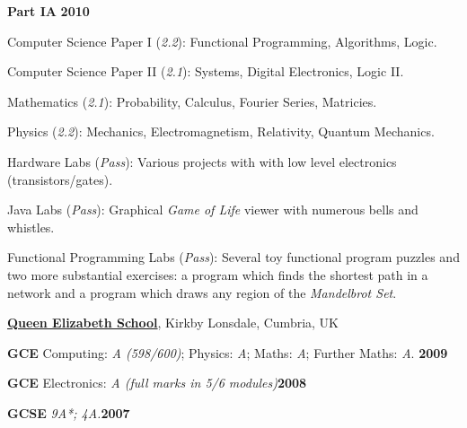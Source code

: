 \documentclass[10pt]{article}
\newenvironment{outerlist}[1][\enskip\textbullet]%
        {\begin{itemize}[#1]}{\end{itemize}%
         \vspace{-.6\baselineskip}}
\newenvironment{innerlist}[1][\enskip\textbullet]%
        {\begin{compactitem}[#1]}{\end{compactitem}}
\newcommand{\blankline}{\quad\pagebreak[2]}
\begin{document}
\begin{outerlist}
\begin{innerlist}
\blankline
\item[] \textbf{Part IA} \hfill \textbf{2010}
        \begin{innerlist}
        \item Computer Science Paper I (\emph{2.2}): Functional Programming, Algorithms, Logic.
        \item Computer Science Paper II (\emph{2.1}): Systems, Digital Electronics, Logic II.
        \item Mathematics (\emph{2.1}): Probability, Calculus, Fourier Series, Matricies.
	\item Physics (\emph{2.2}): Mechanics, Electromagnetism, Relativity, Quantum Mechanics.
	\item Hardware Labs (\emph{Pass}): Various projects with with low level electronics (transistors/gates).
	\item Java Labs (\emph{Pass}): Graphical \emph{Game of Life} viewer with numerous bells and whistles.
	\item Functional Programming Labs (\emph{Pass}): Several toy functional program puzzles and two more substantial exercises: a program which finds the shortest path in a network and a program which draws any region of the \emph{Mandelbrot Set}.
        \end{innerlist}
\end{innerlist}
\end{outerlist}

\blankline

\textbf{\href{http://www.queenelizabeth.cumbria.sch.uk/}{Queen Elizabeth School}}, Kirkby Lonsdale, Cumbria, UK
\begin{innerlist}
\item[] \textbf{GCE} Computing: \emph{A (598/600)}; Physics: \emph{A}; Maths: \emph{A}; Further Maths: \emph{A}. \hfill \textbf{2009}
\item[] \textbf{GCE} Electronics: \emph{A (full marks in 5/6 modules)}\hfill \textbf{2008}
\item[] \textbf{GCSE} \emph{9A*; 4A.}\hfill \textbf{2007}

\end{innerlist}
\end{document}
